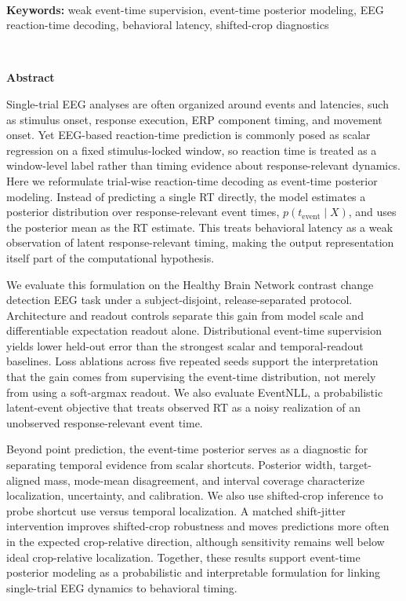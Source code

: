 \documentclass[12pt]{article}
\begin{document}
\ \\[-2mm]
{\bf Keywords:} weak event-time supervision, event-time posterior modeling, EEG reaction-time decoding, behavioral latency, shifted-crop diagnostics

\thispagestyle{empty}
%
\ \vspace{-0mm}\\
%
\begin{center} {\bf Abstract} \end{center}



Single-trial EEG analyses are often organized around events and latencies, such as stimulus onset, response execution, ERP component timing, and movement onset. Yet EEG-based reaction-time prediction is commonly posed as scalar regression on a fixed stimulus-locked window, so reaction time is treated as a window-level label rather than timing evidence about response-relevant dynamics. Here we reformulate trial-wise reaction-time decoding as event-time posterior modeling. Instead of predicting a single RT directly, the model estimates a posterior distribution over response-relevant event times, \(p(t_{\mathrm{event}} \mid X)\), and uses the posterior mean as the RT estimate. This treats behavioral latency as a weak observation of latent response-relevant timing, making the output representation itself part of the computational hypothesis.

We evaluate this formulation on the Healthy Brain Network contrast change detection EEG task under a subject-disjoint, release-separated protocol. Architecture and readout controls separate this gain from model scale and differentiable expectation readout alone. Distributional event-time supervision yields lower held-out error than the strongest scalar and temporal-readout baselines. Loss ablations across five repeated seeds support the interpretation that the gain comes from supervising the event-time distribution, not merely from using a soft-argmax readout. We also evaluate EventNLL, a probabilistic latent-event objective that treats observed RT as a noisy realization of an unobserved response-relevant event time.

Beyond point prediction, the event-time posterior serves as a diagnostic for separating temporal evidence from scalar shortcuts. Posterior width, target-aligned mass, mode-mean disagreement, and interval coverage characterize localization, uncertainty, and calibration. We also use shifted-crop inference to probe shortcut use versus temporal localization. A matched shift-jitter intervention improves shifted-crop robustness and moves predictions more often in the expected crop-relative direction, although sensitivity remains well below ideal crop-relative localization. Together, these results support event-time posterior modeling as a probabilistic and interpretable formulation for linking single-trial EEG dynamics to behavioral timing.
\end{document}
